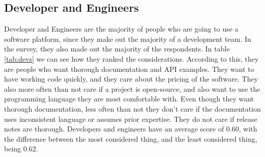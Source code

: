 \documentclass{cslthse-msc}
\begin{document}
    \subsection{Developer and Engineers}
    Developer and Engineers are the majority of people who are going to use a software platform, since they make out the majority of a development team. In the survey, they also made out the majority of the respondents. In table \ref{tab:devs} we can see how they ranked the considerations. According to this, they are people who want thorough documentation and API examples. They want to have working code quickly, and they care about the pricing of the software. They also more often than not care if a project is open-source, and also want to use the programming language they are most comfortable with. Even though they want thorough documentation, less often than not they don't care if the documentation uses inconsistent language or assumes prior expertise. They do not care if release notes are thorough. Developers and engineers have an average score of 0.60, with the difference between the most considered thing, and the least considered thing, being 0.62.
\end{document}

